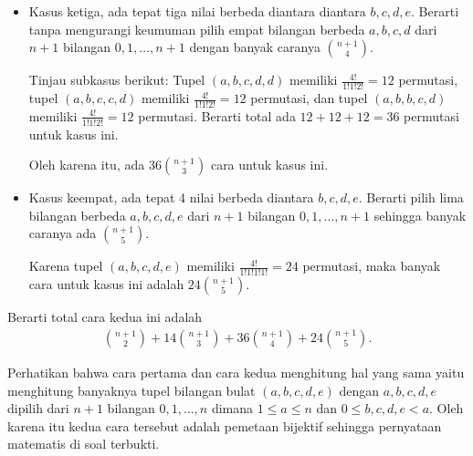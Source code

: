 \documentclass[12pt]{scrartcl}
\begin{document}
\begin{soaljawab}
\begin{solusi}
\begin{itemize}
		\item Kasus ketiga, ada tepat tiga nilai berbeda diantara diantara $b,c,d,e$. Berarti tanpa mengurangi keumuman pilih empat bilangan berbeda $a,b,c,d$ dari $n+1$ bilangan $0,1,\dots,n+1$ dengan banyak caranya ${n+1 \choose 4}$.
				
		Tinjau subkasus berikut: Tupel $(a,b,c,d,d)$ memiliki $\frac{4!}{1!1!2!}=12$ permutasi, tupel $(a,b,c,c,d)$ memiliki $\frac{4!}{1!1!2!}=12$ permutasi, dan tupel $(a,b,b,c,d)$ memiliki $\frac{4!}{1!1!2!}=12$ permutasi. Berarti total ada $12+12+12=36$ permutasi untuk kasus ini.
				
		Oleh karena itu, ada $36{n+1 \choose 3}$ cara untuk kasus ini.
		
		\item Kasus keempat, ada tepat 4 nilai berbeda diantara $b,c,d,e$. Berarti pilih lima bilangan berbeda $a,b,c,d,e$ dari $n+1$ bilangan $0,1,\dots,n+1$ sehingga banyak caranya ada ${n+1 \choose 5}$.
		
		Karena tupel $(a,b,c,d,e)$ memiliki $\frac{4!}{1!1!1!1!}=24$ permutasi, maka banyak cara untuk kasus ini adalah $24{n+1 \choose 5}$.
	
		\end{itemize}
		Berarti total cara kedua ini adalah 
		\begin{align*}
		{n+1 \choose 2} + 14{n+1 \choose 3}+36{n+1 \choose 4}+24{n+1 \choose 5}.
		\end{align*}

    Perhatikan bahwa cara pertama dan cara kedua menghitung hal yang sama  yaitu menghitung banyaknya tupel bilangan bulat $(a,b,c,d,e)$ dengan $a,b,c,d,e$ dipilih dari $n+1$ bilangan $0,1,\dots,n$ dimana $1 \le a \le n$ dan $0 \le b,c,d,e < a$. Oleh karena itu kedua cara tersebut adalah pemetaan bijektif sehingga pernyataan matematis di soal terbukti.
  
    \end{solusi}
\end{soaljawab}
\end{document}
